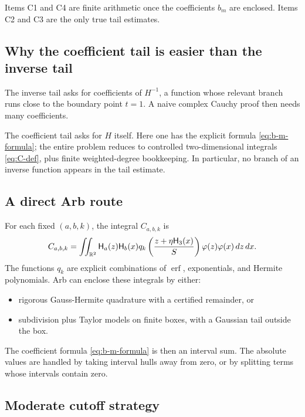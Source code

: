 \documentclass[11pt]{article}
\newcommand{\R}{\mathbb{R}}
\newcommand{\1}{\mathbf{1}}
\newcommand{\Herm}{\mathsf H}
\newcommand{\erf}{\operatorname{erf}}
\begin{document}
Items C1 and C4 are finite arithmetic once the coefficients \(b_m\) are enclosed.  Items C2 and C3 are the only true tail estimates.

\subsection{Why the coefficient tail is easier than the inverse tail}

The inverse tail asks for coefficients of \(H^{-1}\), a function whose relevant branch runs close to the boundary point \(t=1\).  A naive complex Cauchy proof then needs many coefficients.

The coefficient tail asks for \(H\) itself.  Here one has the explicit formula \eqref{eq:b-m-formula}; the entire problem reduces to controlled two-dimensional integrals \eqref{eq:C-def}, plus finite weighted-degree bookkeeping.  In particular, no branch of an inverse function appears in the tail estimate.

\subsection{A direct Arb route}

For each fixed \((a,b,k)\), the integral \(C_{a,b,k}\) is
\[
        C_{a,b,k}=\iint_{\R^2}
        \Herm_a(z)\Herm_b(x)
        q_k\left({z+\eta\Herm_3(x)\over S}\right)
        \varphi(z)\varphi(x)\,dz\,dx.
\]
The functions \(q_k\) are explicit combinations of \(\erf\), exponentials, and Hermite polynomials.  Arb can enclose these integrals by either:
\begin{itemize}[leftmargin=0.35in]
\item rigorous Gauss-Hermite quadrature with a certified remainder, or
\item subdivision plus Taylor models on finite boxes, with a Gaussian tail outside the box.
\end{itemize}

The coefficient formula \eqref{eq:b-m-formula} is then an interval sum.  The absolute values are handled by taking interval hulls away from zero, or by splitting terms whose intervals contain zero.

\subsection{Moderate cutoff strategy}
\end{document}
